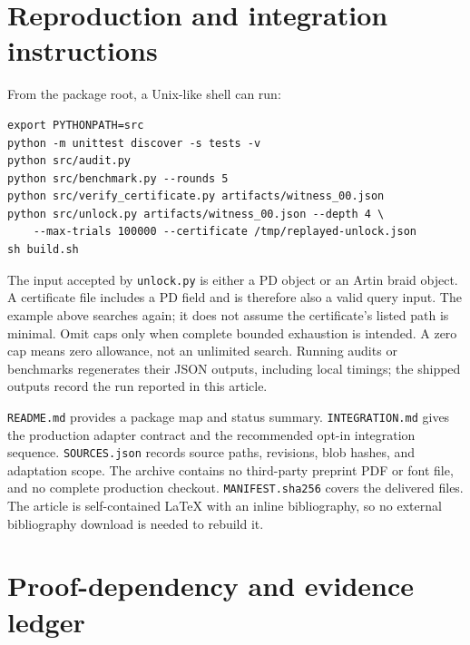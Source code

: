 \documentclass[11pt]{article}
\theoremstyle{definition}
\newcommand{\code}[1]{\texttt{#1}}
\begin{document}
\section{Reproduction and integration instructions}

From the package root, a Unix-like shell can run:
\begin{lstlisting}
export PYTHONPATH=src
python -m unittest discover -s tests -v
python src/audit.py
python src/benchmark.py --rounds 5
python src/verify_certificate.py artifacts/witness_00.json
python src/unlock.py artifacts/witness_00.json --depth 4 \
    --max-trials 100000 --certificate /tmp/replayed-unlock.json
sh build.sh
\end{lstlisting}
The input accepted by \code{unlock.py} is either a PD object or an Artin
braid object. A certificate file includes a PD field and is therefore also
a valid query input. The example above searches again; it does not assume
the certificate's listed path is minimal. Omit caps only when complete
bounded exhaustion is intended. A zero cap means zero allowance, not an
unlimited search. Running audits or benchmarks regenerates their JSON
outputs, including local timings; the shipped outputs record the run
reported in this article.

\code{README.md} provides a package map and status summary.
\code{INTEGRATION.md} gives the production adapter contract and the
recommended opt-in integration sequence. \code{SOURCES.json} records
source paths, revisions, blob hashes, and adaptation scope. The archive
contains no third-party preprint PDF or font file, and no complete
production checkout. \code{MANIFEST.sha256} covers the delivered files.
The article is self-contained LaTeX with an inline bibliography, so no
external bibliography download is needed to rebuild it.

\section{Proof-dependency and evidence ledger}
\end{document}

